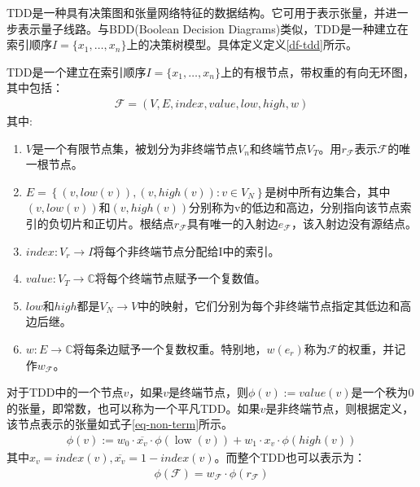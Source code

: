 TDD是一种具有决策图和张量网络特征的数据结构\citep{Hong_2022}。它可用于表示张量，并进一步表示量子线路。与BDD(Boolean Decision Diagrams)类似，TDD是一种建立在索引顺序$I=\{x_1,\ldots,x_n\}$上的决策树模型。具体定义定义\ref{df-tdd}所示。
\begin{definition}\citep{Hong_2022}
    \label{df-tdd}
    TDD是一个建立在索引顺序$I=\{x_1,\ldots,x_n\}$上的有根节点，带权重的有向无环图，其中包括：
    \begin{align}
        \mathcal{F}=\left(V,E,index,value,low,high,w\right)
    \end{align}
    其中:
    \begin{enumerate}
        \item $V$是一个有限节点集，被划分为非终端节点$V_n$和终端节点$V_T$。用$r_{\mathcal{F}}$表示$\mathcal{F}$的唯一根节点。
        \item $E=\left\{\left(v,low\left(v\right)\right),\left(v,high\left(v\right)\right):v\in V_N\right\}$是树中所有边集合，其中$\left(v,low\left(v\right)\right)$和$\left(v,high\left(v\right)\right)$分别称为v的低边和高边，分别指向该节点索引的负切片和正切片。根结点$r_{\mathcal{F}}$具有唯一的入射边$e_{\mathcal{F}}$，该入射边没有源结点。
        \item $index:V_r\rightarrow I$将每个非终端节点分配给I中的索引。
        \item $value:V_T\rightarrow\mathbb{C}$将每个终端节点赋予一个复数值。
        \item $low$和$high$都是$V_N\rightarrow V$中的映射，它们分别为每个非终端节点指定其低边和高边后继。
        \item $w:E\rightarrow\mathbb{C}$将每条边赋予一个复数权重。特别地，$w\left(e_r\right)$称为$\mathcal{F}$的权重，并记作$w_{\mathcal{F}}$。
    \end{enumerate} 
\end{definition}


对于TDD中的一个节点$v$，如果$v$是终端节点，则$\phi\left(v\right):= value (v)$是一个秩为$0$的张量，即常数，也可以称为一个平凡TDD。如果$v$是非终端节点，则根据定义，该节点表示的张量如式子\ref{eq-non-term}所示。
\begin{align}
    \label{eq-non-term}
    \phi(v):=w_{0} \cdot \overline{x_{v}} \cdot \phi(\operatorname{low}(v))+w_{1} \cdot x_{v} \cdot \phi(h i g h(v))
\end{align}
其中$x_v=index\left(v\right),\overline{x_{v}}=1-index\left(v\right)$。而整个TDD也可以表示为：
\begin{align}
    \phi\left(\mathcal{F}\right)=w_{\mathcal{F}}\cdot\phi\left(r_{\mathcal{F}}\right)
\end{align}



